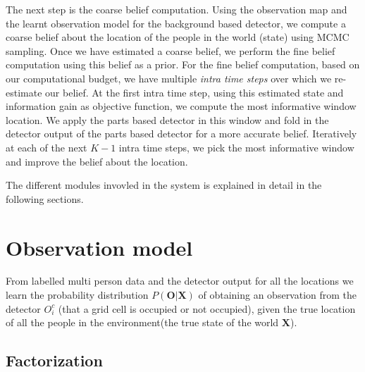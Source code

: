 \documentclass[10pt,twocolumn,letterpaper]{article}
\begin{document}
The next step is the coarse belief computation. Using the observation map and the learnt observation model for the background based detector, we compute a coarse belief about the location of the people in the world (state) using MCMC sampling.
Once we have estimated a coarse belief, we perform the fine belief computation using this belief as a prior.
For the fine belief computation, based on our computational budget, we have multiple \emph{intra time steps} over which we re-estimate our belief. 
At the first intra time step, using this estimated state and information gain as objective function, we compute the most informative window location.
We apply the parts based detector in this window and fold in the detector output of the parts based detector for a more accurate belief.
Iteratively at each of the next $K-1$ intra time steps, we pick the most informative window and improve the belief about the location.

The different modules invovled in the system is explained in detail in the following sections.

\section{Observation model} \label{sec:obs}
From labelled multi person data and the detector output for all the locations we learn the probability distribution $ P(\textbf{O}|\textbf{X})  $ of
obtaining an observation from the detector $ O^{c}_{i} $ (that a grid cell is occupied or not occupied), given the true location of all the people in the environment(the true state of the world $\textbf{X}$).

\subsection{Factorization}
\end{document}
